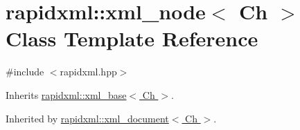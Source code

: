 \hypertarget{classrapidxml_1_1xml__node}{\section{rapidxml\-:\-:xml\-\_\-node$<$ Ch $>$ Class Template Reference}
\label{classrapidxml_1_1xml__node}
}


{\ttfamily \#include $<$rapidxml.\-hpp$>$}



Inherits \hyperlink{classrapidxml_1_1xml__base}{rapidxml\-::xml\-\_\-base$<$ Ch $>$}.



Inherited by \hyperlink{classrapidxml_1_1xml__document}{rapidxml\-::xml\-\_\-document$<$ Ch $>$}.

